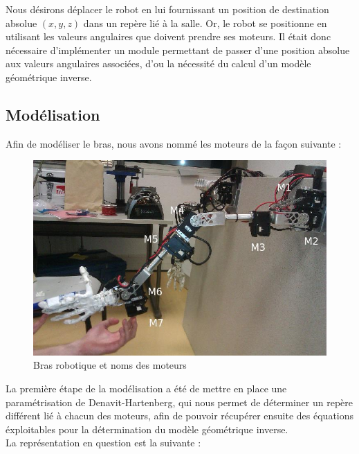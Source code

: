 Nous désirons déplacer le robot en lui fournissant un position de destination absolue $(x, y, z)$ dans un repère lié à la salle. Or, le robot se positionne en utilisant les valeurs angulaires que doivent prendre ses moteurs. Il était donc nécessaire d'implémenter un module permettant de passer d'une position absolue aux valeurs angulaires associées, d'ou la nécessité du calcul d'un modèle géométrique inverse.

\subsection{Modélisation}

Afin de modéliser le bras, nous avons nommé les moteurs de la façon suivante :\\

\begin{figure}[!htc]
	\begin{center}
		\includegraphics[scale=0.6]{images/robot1.jpg}
		\caption{Bras robotique et noms des moteurs} 
		\label{general}
	\end{center}
\end{figure}

La première étape de la modélisation a été de mettre en place une paramétrisation de Denavit-Hartenberg, qui nous permet de déterminer un repère différent lié à chacun des moteurs, afin de pouvoir récupérer ensuite des équations éxploitables pour la détermination du modèle géométrique inverse.\\

La représentation en question est la suivante :\\

